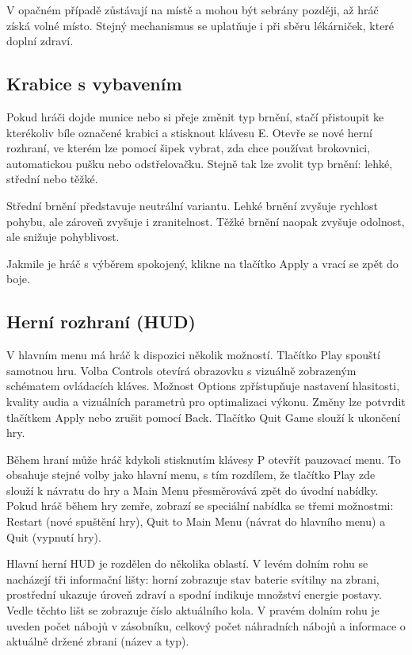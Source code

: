 V opačném případě zůstávají na místě a mohou být sebrány později, až hráč získá volné místo. Stejný mechanismus se uplatňuje i při sběru lékárniček, které doplní zdraví.

\subsection{Krabice s vybavením}
Pokud hráči dojde munice nebo si přeje změnit typ brnění, stačí přistoupit ke kterékoliv bíle označené krabici a stisknout klávesu E. Otevře se nové herní rozhraní, ve kterém lze pomocí šipek vybrat, zda chce používat brokovnici, automatickou pušku nebo odstřelovačku. Stejně tak lze zvolit typ brnění: lehké, střední nebo těžké.

Střední brnění představuje neutrální variantu. Lehké brnění zvyšuje rychlost pohybu, ale zároveň zvyšuje i zranitelnost. Těžké brnění naopak zvyšuje odolnost, ale snižuje pohyblivost.

Jakmile je hráč s výběrem spokojený, klikne na tlačítko Apply a vrací se zpět do boje.

\subsection{Herní rozhraní (HUD)}
V hlavním menu má hráč k dispozici několik možností. Tlačítko Play spouští samotnou hru. Volba Controls otevírá obrazovku s vizuálně zobrazeným schématem ovládacích kláves. Možnost Options zpřístupňuje nastavení hlasitosti, kvality audia a vizuálních parametrů pro optimalizaci výkonu. Změny lze potvrdit tlačítkem Apply nebo zrušit pomocí Back. Tlačítko Quit Game slouží k ukončení hry.

Během hraní může hráč kdykoli stisknutím klávesy P otevřít pauzovací menu. To obsahuje stejné volby jako hlavní menu, s tím rozdílem, že tlačítko Play zde slouží k návratu do hry a Main Menu přesměrovává zpět do úvodní nabídky. Pokud hráč během hry zemře, zobrazí se speciální nabídka se třemi možnostmi: Restart (nové spuštění hry), Quit to Main Menu (návrat do hlavního menu) a Quit (vypnutí hry).

Hlavní herní HUD je rozdělen do několika oblastí. V levém dolním rohu se nacházejí tři informační lišty: horní zobrazuje stav baterie svítilny na zbrani, prostřední ukazuje úroveň zdraví a spodní indikuje množství energie postavy. Vedle těchto lišt se zobrazuje číslo aktuálního kola. V pravém dolním rohu je uveden počet nábojů v zásobníku, celkový počet náhradních nábojů a informace o aktuálně držené zbrani (název a typ).

